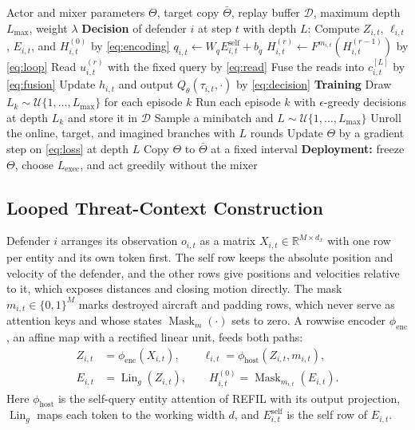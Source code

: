 \begin{algorithm}[!t]
\caption{LEAF Decision and Sampled-Depth Training}
\label{alg:leaf}
\begin{algorithmic}[1]
\REQUIRE Actor and mixer parameters $\Theta$, target copy $\bar\Theta$, replay buffer $\mathcal D$, maximum depth $L_{\max}$, weight $\lambda$
\STATE \textbf{Decision} of defender $i$ at step $t$ with depth $L$:
\STATE Compute $Z_{i,t}$, $\ell_{i,t}$, $E_{i,t}$, and $H^{(0)}_{i,t}$ by \eqref{eq:encoding}
\STATE $q_{i,t}\gets W_qE^{\mathrm{self}}_{i,t}+b_q$
\STATE $H^{(r)}_{i,t}\gets F^{m_{i,t}}(H^{(r-1)}_{i,t})$ by \eqref{eq:loop} 
\STATE Read $u^{(r)}_{i,t}$ with the fixed query by \eqref{eq:read} 
\ENDFOR
\STATE Fuse the reads into $c^{[L]}_{i,t}$ by \eqref{eq:fusion} 
\STATE Update $h_{i,t}$ and output $Q_\theta(\tau_{i,t},\cdot)$ by \eqref{eq:decision} 
\STATE \textbf{Training} 
\STATE Draw $L_k\sim\mathcal U\{1,\dots,L_{\max}\}$ for each episode $k$
\STATE Run each episode $k$ with $\epsilon$-greedy decisions at depth $L_k$ and store it in $\mathcal D$
\STATE Sample a minibatch and $L\sim\mathcal U\{1,\dots,L_{\max}\}$
\STATE Unroll the online, target, and imagined branches with $L$ rounds
\STATE Update $\Theta$ by a gradient step on \eqref{eq:loss} at depth $L$
\ENDFOR
\STATE Copy $\Theta$ to $\bar\Theta$ at a fixed interval
\ENDFOR
\STATE \textbf{Deployment:} freeze $\Theta$, choose $L_{\mathrm{exec}}$, and act greedily without the mixer
\end{algorithmic}
\end{algorithm}

\subsection{Looped Threat-Context Construction}
\label{subsec:method-loop}
Defender $i$ arranges its observation $o_{i,t}$ as a matrix $X_{i,t}\in\mathbb R^{M\times d_x}$ with one row per entity and its own token first. The self row keeps the absolute position and velocity of the defender, and the other rows give positions and velocities relative to it, which exposes distances and closing motion directly. The mask $m_{i,t}\in\{0,1\}^{M}$ marks destroyed aircraft and padding rows, which never serve as attention keys and whose states $\operatorname{Mask}_{m}(\cdot)$ sets to zero. A rowwise encoder $\phi_{\mathrm{enc}}$, an affine map with a rectified linear unit, feeds both paths:
\begin{align}
Z_{i,t}&=\phi_{\mathrm{enc}}(X_{i,t}),\qquad \ell_{i,t}=\phi_{\mathrm{host}}(Z_{i,t},m_{i,t}),\nonumber\\
E_{i,t}&=\operatorname{Lin}_{g}(Z_{i,t}),\qquad H^{(0)}_{i,t}=\operatorname{Mask}_{m_{i,t}}(E_{i,t}).
\label{eq:encoding}
\end{align}
Here $\phi_{\mathrm{host}}$ is the self-query entity attention of REFIL with its output projection, $\operatorname{Lin}_{g}$ maps each token to the working width $d$, and $E^{\mathrm{self}}_{i,t}$ is the self row of $E_{i,t}$.


